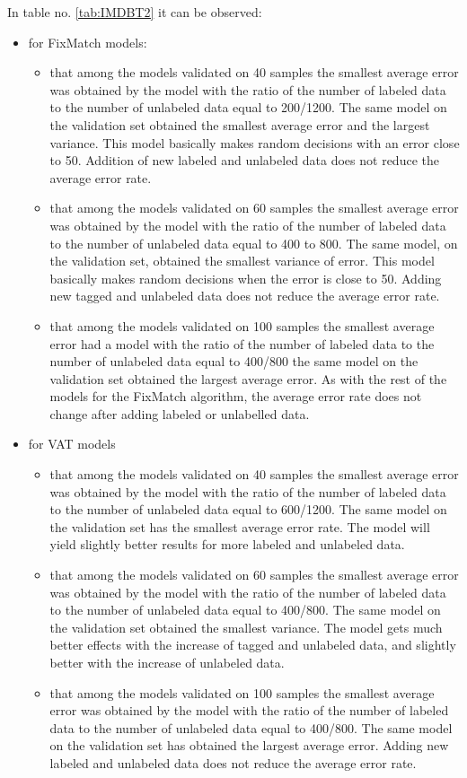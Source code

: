 \documentclass[12pt]{article}
\theoremstyle{definition}
\DeclareRobustCommand{\[}{\begin{equation}}
\DeclareRobustCommand{\]}{\end{equation}}
\begin{document}
\vspace{5mm} %
\vspace{5mm} %
In table no. \ref{tab:IMDBT2} it can be observed:
\begin{itemize}
    \item for FixMatch models:
    \begin{itemize}
        \item that among the models validated on 40 samples the smallest average error was obtained by the model with the ratio of the number of labeled data to the number of unlabeled data equal to 200/1200. The same model on the validation set obtained the smallest average error and the largest variance. This model basically makes random decisions with an error close to 50. Addition of new labeled and unlabeled data does not reduce the average error rate. 
         \item that among the models validated on 60 samples the smallest average error was obtained by the model with the ratio of the number of labeled data to the number of unlabeled data  equal to 400 to 800. The same model, on the validation set, obtained the smallest variance of error. This model basically makes random decisions when the error is close to 50.
         Adding new tagged and unlabeled data does not reduce the average error rate.  
        \item that among the models validated on 100 samples the smallest average error had a model with the ratio of the number of labeled data to the number of unlabeled data equal to 400/800 the same model on the validation set obtained the largest average error.  As with the rest of the models for the FixMatch algorithm, the average error rate does not change after adding labeled or unlabelled data.  
    \end{itemize}
    \item for VAT models
    \begin{itemize}
        \item that among the models validated on 40 samples the smallest average error was obtained by the model with the ratio of the number of labeled data to the number of unlabeled data equal to 600/1200. The same model on the validation set has the smallest average error rate. The model will yield slightly better results for more labeled and unlabeled data.
        \item that among the models validated on 60 samples the smallest average error was obtained by the model with the ratio of the number of labeled data to the number of unlabeled data equal to 400/800. The same model on the validation set obtained the smallest variance. The model gets much better effects with the increase of tagged and unlabeled data, and slightly better with the increase of unlabeled data.
        \item that among the models validated on 100 samples the smallest average error was obtained by the model with the ratio of the number of labeled data to the number of unlabeled data equal to 400/800. The same model on the validation set has obtained the largest average error. Adding new labeled and unlabeled data does not reduce the average error rate. 
    \end{itemize}
\end{itemize}
\end{document}

